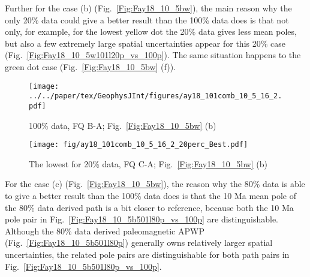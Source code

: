 Further for the case (b) (Fig.~\ref{Fig:Fay18_10_5bw}), the main reason why the
only 20\% data could give a better result than the 100\% data does is that not
only, for example, for the lowest yellow dot the 20\% data gives less mean
poles, but also a few extremely large spatial uncertainties appear for this
20\% case (Fig.~\ref{Fig:Fay18_10_5w101l20p_vs_100p}). The same situation
happens to the green dot case (Fig.~\ref{Fig:Fay18_10_5bw} (f)).

\begin{figure*}[tbp]
  \captionsetup[subfigure]{labelformat=empty,aboveskip=-6pt,belowskip=-6pt}
  \centering
  \begin{subfigure}[htbp]{.49\textwidth}
    \captionsetup{skip=0pt}
    \centering
    \texttt{[image: ../../paper/tex/GeophysJInt/figures/ay18\_101comb\_10\_5\_16\_2.pdf]}
	\caption{100\% data, FQ B-A; Fig.~\ref{Fig:Fay18_10_5bw}
	(b)}\label{Fig:Fay18_10_5w101}
  \end{subfigure}
  \begin{subfigure}[htbp]{.49\textwidth}
    \captionsetup{skip=0pt}
    \centering
    \texttt{[image: fig/ay18\_101comb\_10\_5\_16\_2\_20perc\_Best.pdf]}  %
    \caption{The lowest for 20\% data, FQ C-A;
	Fig.~\ref{Fig:Fay18_10_5bw} (b)}\label{Fig:Fay18_10_5w101l20p}
  \end{subfigure}
  \caption[Less data, better similarity?]{Comparing the 100\% North American
  120 Ma paleomagnetic data derived result with the best of the only
  20\% data (giving even better similarity) derived results (the yellow dot in
  Fig.~\ref{Fig:Fay18_10_5bw} (b)).}\label{Fig:Fay18_10_5w101l20p_vs_100p}
\end{figure*}

For the case (c) (Fig.~\ref{Fig:Fay18_10_5bw}), the reason why the 80\% data is
able to give a better result than the 100\% data does is that the 10 Ma mean
pole of the 80\% data derived path is a bit closer to reference, because both
the 10 Ma pole pair in Fig.~\ref{Fig:Fay18_10_5b501l80p_vs_100p} are
distinguishable. Although the 80\% data derived paleomagnetic APWP
(Fig.~\ref{Fig:Fay18_10_5b501l80p}) generally owns relatively larger spatial
uncertainties, the related pole pairs are distinguishable for both path pairs in
Fig.~\ref{Fig:Fay18_10_5b501l80p_vs_100p}.

